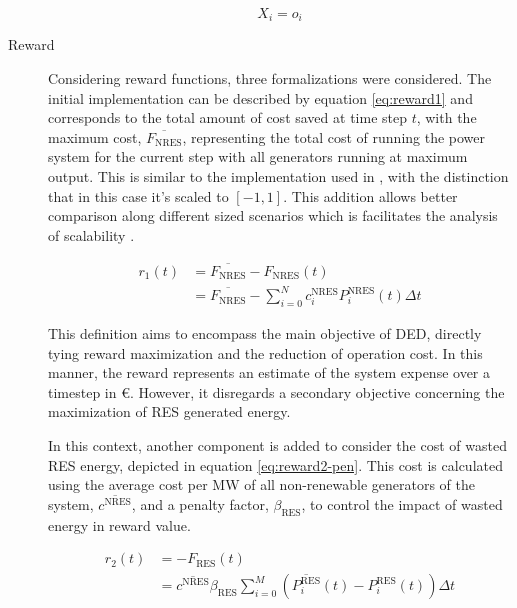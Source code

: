 \begin{description}
	\begin{equation}
		X_i = o_i
	\end{equation}
	

	
	\item[Reward] Considering reward functions, three formalizations were considered. The initial implementation can be described by equation \ref{eq:reward1} and corresponds to the total amount of cost saved at time step $t$, with the maximum cost, $\overline{F_\text{NRES}}$, representing the total cost of running the power system for the current step with all generators running at maximum output. This is similar to the implementation used in \cite{liNovelGraphReinforcement2022, chenScalableGraphReinforcement2023}, with the distinction that in this case it's scaled to $[-1,1]$. This addition allows better comparison along different sized scenarios which is facilitates the analysis of scalability . \par
	
	
	\begin{equation} \label{eq:reward1}
		\begin{split}
			r_1(t) &= \overline{F_\text{NRES}} - F_\text{NRES}(t) \\
			&= \overline{F_\text{NRES}} - \sum^N_{i=0} c^\text{NRES}_i P^\text{NRES}_i(t) \Delta t
		\end{split}
	\end{equation}
	
	This definition aims to encompass the main objective of \ac{DED}, directly tying reward maximization and the reduction of operation cost. In this manner, the reward represents an estimate of the system expense over a timestep in €. However, it disregards a secondary objective concerning the maximization of \ac{RES} generated energy. \par
	In this context, another component is added to consider the cost of wasted \ac{RES} energy, depicted in equation \ref{eq:reward2-pen}. This cost is calculated using the average cost per MW of all non-renewable generators of the system, $\overline{c^\text{NRES}}$, and a penalty factor, $\beta_\text{RES}$, to control the impact of wasted energy in reward value. \par
	
	\begin{equation} \label{eq:reward2-pen}
		\begin{split}
			r_2(t) &= - F_\text{RES}(t) \\
			&= \overline{c^\text{NRES}} \beta_\text{RES} \sum^M_{i=0} (\overline{P^\text{RES}_i}(t) - P^\text{RES}_i(t)) \Delta t 
		\end{split}
	\end{equation}
	

\end{description}

